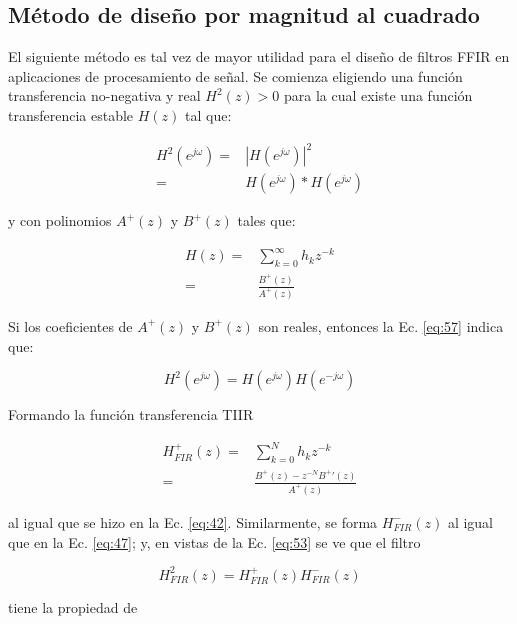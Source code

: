 \subsection{Método de diseño por magnitud al cuadrado}
    El siguiente método es tal vez de mayor utilidad para el diseño de filtros FFIR en aplicaciones de procesamiento de señal. Se comienza eligiendo una función transferencia no-negativa y real $H^2(z)>0$ para la cual existe una función transferencia estable $H(z)$ tal que:

    \begin{align}
      H^2 \left( e^{j\omega} \right) =& |H \left( e^{j\omega} \right)|^2\\
      =& H \left( e^{j\omega} \right) * H \left( e^{j\omega} \right)
         \label{eq:57}
    \end{align}

    y con polinomios $A^{ + }(z)$ y $B^{ + }(z)$ tales que:

    \begin{align}
      H(z) =& \sum_{k=0}^{\infty}{h_k z^{-k}}\\
      =& \frac{B^{ + }(z)}{A^{ + }(z)}
    \end{align}

    Si los coeficientes de $A^{ + }(z)$ y $B^{ + }(z)$ son reales, entonces la Ec. \ref{eq:57} indica que:

    \begin{equation}
      H^2 \left( e^{j\omega} \right) = H \left( e^{j\omega} \right) H \left( e^{-j\omega} \right)
    \end{equation}

    Formando la función transferencia TIIR

    \begin{align}
      H_{FIR}^{+}(z) =& \sum_{k=0}^{N}{h_k z^{-k}} \\
      =& \frac{B^{+}(z) - z^{-N} B^{+}\prime (z)}{A^{ + }(z)}
         \label{eq:60}
    \end{align}

    al igual que se hizo en la Ec. \ref{eq:42}. Similarmente, se forma $H_{FIR}^{-}(z)$ al igual que en la Ec. \ref{eq:47}; y, en vistas de la Ec. \ref{eq:53} se ve que el filtro

    \begin{equation}
      H^2_{FIR}(z) = H_{FIR}^{ + }(z) H_{FIR}^{ - }(z)
    \end{equation}

    tiene la propiedad de

